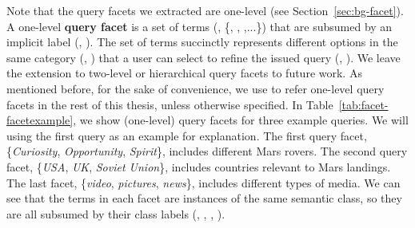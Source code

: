 Note that the query facets we extracted are one-level (see Section~\ref{sec:bg-facet}). A one-level \textbf{query facet} is a set of terms (\eg, \{, , ,...\}) that are subsumed by an implicit label (\eg, ). The set of terms succinctly represents different options in the same category (\eg, ) that a user can select to refine the issued query (\eg, ). We leave the extension to two-level or hierarchical query facets to future work. As mentioned before, for the sake of convenience, we use  to refer one-level query facets in the rest of this thesis, unless otherwise specified. 
In Table~\ref{tab:facet-facetexample}, we show (one-level) query facets for three example queries. We will using the first query  as an example for explanation. The first query facet, \{\textit{Curiosity}, \textit{Opportunity}, \textit{Spirit}\}, includes different Mars rovers. The second query facet, \{\textit{USA}, \textit{UK}, \textit{Soviet Union}\}, includes countries relevant to Mars landings. The last facet, \{\textit{video}, \textit{pictures}, \textit{news}\}, includes different types of media. We can see that the terms in each facet are instances of the same semantic class, so they are all subsumed by their class labels (\eg, , , ).
